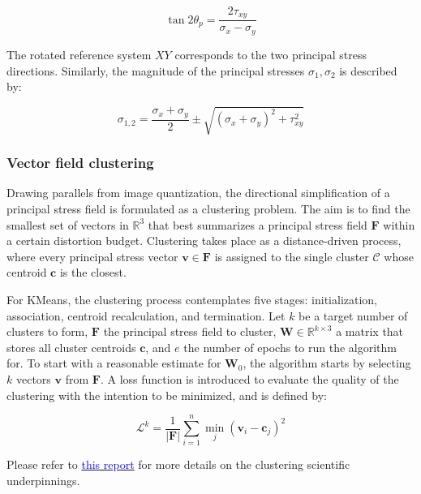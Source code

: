 \documentclass[11pt]{article}
\begin{document}
\begin{equation}
    \tan2\theta_{p} = \frac{2\tau_{xy}}{\sigma_x - \sigma_y}
\end{equation}

The rotated reference system $XY$ corresponds to the two principal stress directions. Similarly, the magnitude of the principal stresses $\sigma_1, \sigma_2$ is described by:

\begin{equation}
    \sigma_{1, 2} = \frac{\sigma_x + \sigma_y}{2} \pm \sqrt{(\sigma_x + \sigma_y)^2 + \tau_{xy}^2}
\end{equation}

\subsubsection{Vector field clustering}

Drawing parallels from image quantization, the directional simplification of a principal stress field is formulated as a clustering problem. The aim is to find the smallest set of vectors in $\mathbb{R}^3$ that best summarizes a principal stress field $\mathbf{F}$ within a certain distortion budget. Clustering takes place as a distance-driven process, where every principal stress vector $\mathbf{v} \in \mathbf{F}$ is assigned to the single cluster $\mathcal{C}$ whose centroid $\mathbf{c}$ is the closest.

For KMeans, the clustering process contemplates five stages: initialization, association, centroid recalculation, and termination. Let $k$ be a target number of clusters to form, $\mathbf{F}$ the principal stress field to cluster, $\mathbf{W} \in \mathbb{R}^{k \times 3}$ a matrix that stores all cluster centroids $\mathbf{c}$, and $e$ the number of epochs to run the algorithm for. To start with a reasonable estimate for  $\mathbf{W}_0$, the algorithm starts by selecting $k$ vectors $\mathbf{v}$ from $\mathbf{F}$. A loss function is introduced to evaluate the quality of the clustering with the intention to be minimized, and is defined by: 

\begin{equation}
    \mathcal{L}^{k} = \frac{1}{|\textbf{F}|} \sum^{n}_{i=1} \min_j (\mathbf{v}_{i} - \mathbf{c}_{j})^{2}
\end{equation}

Please refer to \href{https://drive.google.com/file/d/1gH3feZg796jewtrcDC3sTIwqYr9KsBPV/view}{{\textcolor{blue}{this report}}} for more details on the clustering scientific underpinnings.
\end{document}
